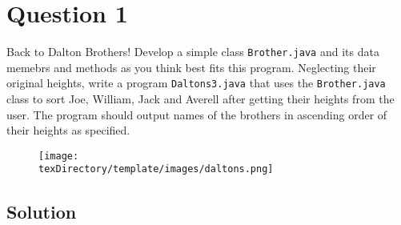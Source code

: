\documentclass[12pt,letterpaper,twoside]{article}
\begin{document}


\section*{Question 1}

Back to Dalton Brothers! Develop a simple class \texttt{Brother.java} and its data memebrs and methods as you think best fits this program. Neglecting their original heights, write a program \texttt{Daltons3.java} that uses the \texttt{Brother.java} class to sort Joe, William, Jack and Averell after getting their heights from the user. The program should output names of the brothers in ascending order of their heights as specified.

\begin{figure}[H]\centering
\texttt{[image: \\texDirectory/template/images/daltons.png]}
\end{figure}

\subsection*{Solution}
\end{document}
